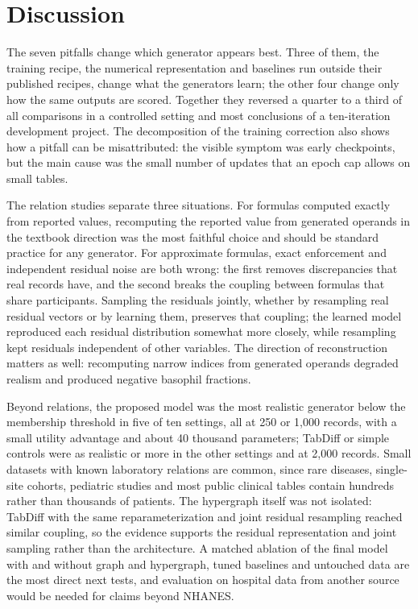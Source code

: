 \documentclass[conference]{IEEEtran}
\begin{document}
\section{Discussion}

The seven pitfalls change which generator appears best. Three of them, the training recipe, the numerical representation and baselines run outside their published recipes, change what the generators learn; the other four change only how the same outputs are scored. Together they reversed a quarter to a third of all comparisons in a controlled setting and most conclusions of a ten-iteration development project. The decomposition of the training correction also shows how a pitfall can be misattributed: the visible symptom was early checkpoints, but the main cause was the small number of updates that an epoch cap allows on small tables.

The relation studies separate three situations. For formulas computed exactly from reported values, recomputing the reported value from generated operands in the textbook direction was the most faithful choice and should be standard practice for any generator. For approximate formulas, exact enforcement and independent residual noise are both wrong: the first removes discrepancies that real records have, and the second breaks the coupling between formulas that share participants. Sampling the residuals jointly, whether by resampling real residual vectors or by learning them, preserves that coupling; the learned model reproduced each residual distribution somewhat more closely, while resampling kept residuals independent of other variables. The direction of reconstruction matters as well: recomputing narrow indices from generated operands degraded realism and produced negative basophil fractions.

Beyond relations, the proposed model was the most realistic generator below the membership threshold in five of ten settings, all at 250 or 1,000 records, with a small utility advantage and about 40 thousand parameters; TabDiff or simple controls were as realistic or more in the other settings and at 2,000 records. Small datasets with known laboratory relations are common, since rare diseases, single-site cohorts, pediatric studies and most public clinical tables contain hundreds rather than thousands of patients. The hypergraph itself was not isolated: TabDiff with the same reparameterization and joint residual resampling reached similar coupling, so the evidence supports the residual representation and joint sampling rather than the architecture. A matched ablation of the final model with and without graph and hypergraph, tuned baselines and untouched data are the most direct next tests, and evaluation on hospital data from another source would be needed for claims beyond NHANES.
\end{document}
